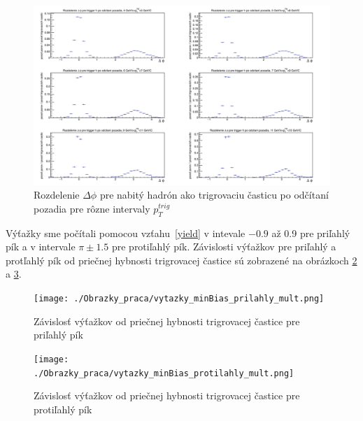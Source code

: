 \documentclass[thesismargins, thesislinespacing]{rnthesis}
\begin{document}
\begin{figure}[hbtp!]
	\centering
	\includegraphics[width=\textwidth]{./Obrazky_praca/DeltaPhiHH.png}
	\caption{Rozdelenie $\Delta \phi$ pre nabitý hadrón ako trigrovaciu časticu po odčítaní pozadia pre rôzne intervaly $p_T^{trig}$}
	\label{hh}
\end{figure}
\newpage

Výťažky sme počítali pomocou vzťahu~\ref{yield} v intevale $-0.9$ až 0.9 pre priľahlý pík a v intervale $\pi\pm1.5$ pre protiľahlý pík. Závislosti výťažkov pre priľahlý a protľahlý pík od priečnej hybnosti trigrovacej častice sú zobrazené na obrázkoch \ref{near} a \ref{away}.

\begin{figure}[hbtp!]
	\centering
	\texttt{[image: ./Obrazky\_praca/vytazky\_minBias\_prilahly\_mult.png]}
	\caption{Závislosť výťažkov od priečnej hybnosti trigrovacej častice pre priľahlý pík}
	\label{near}
\end{figure}

\begin{figure}[hbtp!]
	\centering
	\texttt{[image: ./Obrazky\_praca/vytazky\_minBias\_protilahly\_mult.png]}
	\caption{Závislosť výťažkov od priečnej hybnosti trigrovacej častice pre protiľahlý pík}
	\label{away}
\end{figure}
\end{document}
